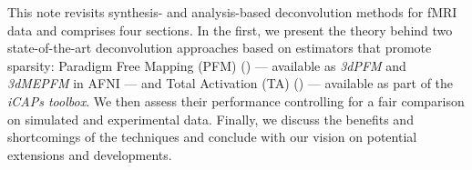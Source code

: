 This note revisits synthesis- and analysis-based deconvolution methods for fMRI data and comprises four sections. In the first, we present the theory behind two state-of-the-art deconvolution approaches based on estimators that promote sparsity: Paradigm Free Mapping (PFM) (\citealt{caballerogaudes2013ParadigmFreeMapping}) --- available as \textit{3dPFM} and \textit{3dMEPFM} in AFNI --- and Total Activation (TA) (\citealt{karahanoglu2013TotalActivationFMRI}) --- available as part of the \textit{iCAPs toolbox}. We then assess their performance controlling for a fair comparison on simulated and experimental data. Finally, we discuss the benefits and shortcomings of the techniques and conclude with our vision on potential extensions and developments.